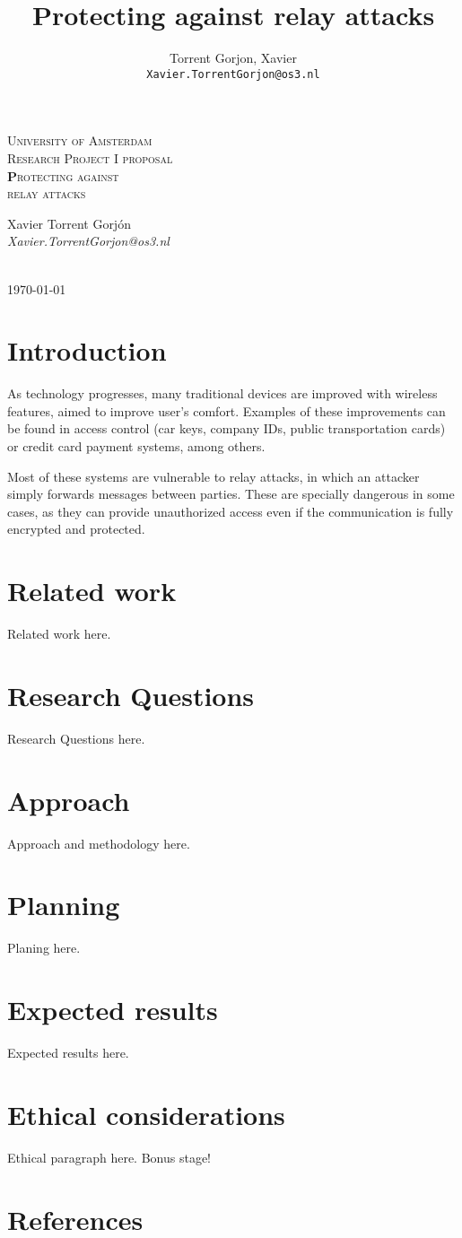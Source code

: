 \documentclass{article}
\author{
  Torrent Gorjon, Xavier\\
  \texttt{Xavier.TorrentGorjon@os3.nl}
}
\title{Protecting against relay attacks}
\begin{document}
\begin{titlepage}
\center

\textsc{\LARGE University of Amsterdam}\\[1.5cm]

\textsc{\Large Research Project I proposal}\\[0.5cm]

\textsc{\Huge \textbf Protecting against\\relay attacks}\\[1.5cm]


\begin{minipage}{0.5 \textwidth}
\begin{center} \large
Xavier Torrent Gorj\'{o}n\\
\emph{Xavier.TorrentGorjon@os3.nl}\\[0.5cm]
\end{center}
\end{minipage}\\[3cm]
{\large \today} 


\end{titlepage}


\newpage

\tableofcontents
\section{Introduction}
As technology progresses, many traditional devices are improved with wireless features, aimed to improve user's comfort. Examples of these improvements can be found in access control (car keys, company IDs, public transportation cards) or credit card payment systems, among others.


Most of these systems are vulnerable to relay attacks, in which an attacker simply forwards messages between parties. These are specially dangerous in some cases, as they can provide unauthorized access even if the communication is fully encrypted and protected.
\section{Related work}
Related work here.
\section{Research Questions}
Research Questions here.
\section{Approach}
Approach and methodology here.
\section{Planning}
Planing here.
\section{Expected results}
Expected results here.
\section{Ethical considerations}
Ethical paragraph here. Bonus stage!
\section{References}
\end{document}
